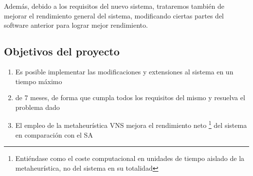 Además, debido a los requisitos del nuevo sistema, trataremos también de mejorar el rendimiento general del sistema,
modificando ciertas partes del software anterior para lograr mejor rendimiento.

\subsection{Objetivos del proyecto}

\label{sec:Objectivos}
\begin{enumerate}[label={H\arabic*}]
    \item[\namedlabel{H1}]  Es posible implementar las modificaciones y extensiones al sistema en un tiempo máximo
    \item de 7 meses, de forma que cumpla todos los requisitos del mismo y resuelva el problema dado %
    \item[\namedlabel{H2}]  El empleo de la metaheurística VNS mejora el rendimiento neto
    \footnote{Entiéndase como el coste computacional en unidades de tiempo aislado de la metaheurística, no del sistema en su totalidad}
    del sistema en comparación con el SA
\end{enumerate}




